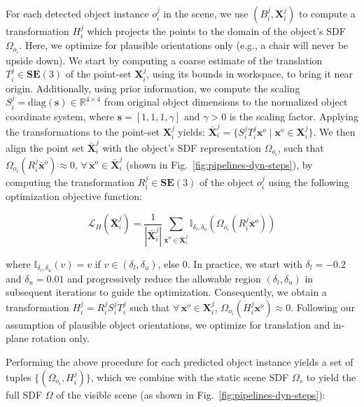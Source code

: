 \documentclass[letterpaper, 10 pt, conference]{ieeeconf}  %
\begin{document}
For each detected object instance $o_i^j$ in the scene, we use $(B_i^j, \mathbf{X}_i^j)$ to compute a transformation $H_i^j$ which projects the points to the domain of the object's SDF $\Omega_{o_i}$.
Here, we optimize for plausible orientations only (e.g., a chair will never be upside down).
We start by computing a coarse estimate of the translation $T_i^j \in \mathbf{SE}(3)$ of the point-set $\mathbf{X}_i^j$, using its bounds in workspace, to bring it near origin.
Additionally, using prior information, we compute the scaling $S_i^j = \mathrm{diag}(\mathbf{s}) \in \mathbb{R}^{4\times4}$ from original object dimensions to the normalized object coordinate system, where $\mathbf{s} = [1, 1, 1, \gamma]$ and $\gamma > 0$ is the scaling factor.
Applying the transformations to the point-set $\mathbf{X}_i^j$ yields: $\bar{\mathbf{X}}_i^j = \{ S_i^j T_i^j \mathbf{x}^o \mid \mathbf{x}^o \in \mathbf{X}_i^j\}$.
We then align the point set $\bar{\mathbf{X}}_i^j$ with the object's SDF representation $\Omega_{o_i}$, such that $\Omega_{o_i}(R_i^j \bar{\mathbf{x}}^o ) \approx 0, \, \forall\, \bar{\mathbf{x}}^o \in \bar{\mathbf{X}}_i^j$ (shown in Fig.~\ref{fig:pipelines-dyn-steps}), by computing the transformation $R_i^j \in \mathbf{SE}(3)$ of the object $o_i^j$ using the following optimization objective function:

\begin{equation}
    \mathcal{L}_H(\bar{\mathbf{X}}_i^j) = \frac{1}{ | \bar{\mathbf{X}}_i^j | } \sum_{\bar{\mathbf{x}}^o \in \bar{\mathbf{X}}_i^j} \mathbb{I}_{\delta_{l}, \delta_{u}}(\Omega_{o_i}(R_i^j \bar{\mathbf{x}}^o))
\end{equation}

\noindent where $\mathbb{I}_{\delta_{l}, \delta_{u}}(v) = v$ if $v \in (\delta_{l}, \delta_{u})$, else $0$.
In practice, we start with $\delta_{l} = -0.2$ and $\delta_{u} = 0.01$ and progressively reduce the allowable region $(\delta_{l}, \delta_{u})$ in subsequent iterations to guide the optimization.
Consequently, we obtain a transformation $H_i^j = R_i^j S_i^j T_i^j$ such that $\forall\, \mathbf{x}^o \in \mathbf{X}_i^j$, $\Omega_{o_i}(H_i^j \mathbf{x}^o) \approx 0$.
Following our assumption of plausible object orientations, we optimize for translation and in-plane rotation only.

Performing the above procedure for each predicted object instance yields a set of tuples $\{ (\Omega_{o_i}, H_i^j) \}$, which we combine with the static scene SDF $\Omega_s$ to yield the full SDF $\Omega$ of the visible scene (as shown in Fig.~\ref{fig:pipelines-dyn-steps}):
\end{document}
